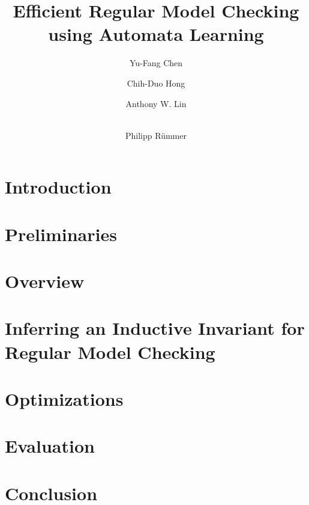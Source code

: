 \documentclass{llncs}
\title{Efficient Regular Model Checking using Automata Learning}
\author{
Yu-Fang Chen\inst{1}
\and
Chih-Duo Hong\inst{1,2}
\and
Anthony W. Lin\inst{2}
\and\\
Philipp R\"ummer\inst{3}
}
\institute
{
Academia Sinica
\and
Oxford University
\and
Uppsala University
}
\begin{document}
\maketitle

\begin{abstract}
 
\end{abstract}

\section{Introduction}
\label{section:introduction}


\section{Preliminaries}
\label{section:preliminaries}


\section{Overview}
\label{section:overview}


\section{Inferring an Inductive Invariant for Regular Model Checking}
\label{section:inferring}


\section{Optimizations}
\label{section:optimizations}



\section{Evaluation}
\label{section:evaluation}


\section{Conclusion}
\label{section:conclusion}





\end{document}
